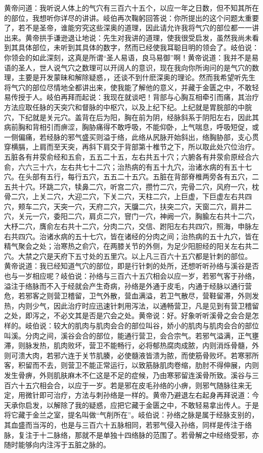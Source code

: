 \documentclass[a4paper,12pt,UTF8,twoside]{ctexbook}
\begin{document}
黄帝问道：我听说人体上的气穴有三百六十五个，以应一年之日数，但不知其所在的部位，我想听你详尽的讲讲。岐伯再次鞠躬回答说：你所提出的这个问题太重要了，若不是圣帝，谁能穷究这些深奥的道理，因此请允许我将气穴的部位都一一讲出来。黄帝拱手谦逊退让地说：先生对我讲的道理，使我很受启发，虽然我尚未看到其具体部位，未听到其具体的数字，然而已经使我耳聪目明的领会了。岐伯说：你领会的如此深刻，这真是所谓“圣人易语，良马易御”啊！黄帝说道：我并不是易语的圣人，世人说气穴之数理可以开阔人的意识，现在我向你所询问的是气穴的数理，主要是开发蒙昧和解除疑惑，，还谈不到什麽深奥的理论。然而我希望听先生将气穴的部位尽情地全都讲出来，使我能了解他的意义，并藏于金匮之中，不敢轻易传授于人。岐伯再拜而起说：我现在就谈吧！背部与心胸互相牵引而痛，其治疗方法应取任脉的天突穴和督脉的中枢穴，以及上纪下纪。上纪就是胃脘部的中脘穴，下纪就是关元穴。盖背在后为阳，胸在前为阴，经脉斜系于阴阳左右，因此其病前胸和背相引而痹涩，胸胁痛得不敢呼吸，不能仰卧，上气喘息，呼吸短促，或一侧偏痛，若经脉的邪气盛买则溢于络，此络从尻脉开始斜出，络胸胁部，支心贯穿横膈，上肩而至天突，再斜下肩交于背部第十椎节之下，所以取此处穴位治疗。
五脏各有井荥俞经和五俞，五五二十五，左右共五十穴；六腑各有井荥俞原经合六俞，六六三十六，左右共七十二穴；治热病的有五十九穴，治诸水病的有五十七穴。在头部有五行，每行五穴，五五二十五穴。五脏在背部脊椎两旁各有五穴，二五共十穴。环跳二穴，犊鼻二穴，听宫二穴，攒竹二穴，完骨二穴，风府一穴，枕骨二穴，上关二穴，大迎二穴，下关二穴，天柱二穴，上巨虚，下巨虚左右共四穴，颊车二穴，天突一穴，天府二穴，天牖二穴，扶突二穴，天窗二穴，肩井二穴，关元一穴，委阳二穴，肩贞二穴，窨门一穴，神阙一穴，胸腧左右共十二穴，大杼二穴，膺俞左右共十二穴，分肉二穴，交信、跗阳左右共四穴，照海，申脉左右共四穴。治诸水病的五十七穴，皆在诸经的分肉之间；治热病的五十九穴，皆在精气聚会之处；治寒热之俞穴，在两膝关节的外侧，为足少阳胆经的阳关左右共二穴。大禁之穴是天府下五寸处的五里穴。以上凡三百六十五穴都是针刺的部位。
黄帝说道：我已经知道气穴的部位，即是行针刺的处所，还想听听孙络与溪谷是否也与一岁相应呢？岐伯说：孙络与三百六十五穴相会以应一岁，若邪气客于孙络，溢注于络脉而不入于经就会产生奇病，孙络是外通于皮毛，内通于经脉以通行营危，若邪客之则营卫稽留，卫气外散，营血满溢，若卫气散尽，营鞋留滞，外则发热，内则少气，因此治疗时应迅速针刺用泻法，以通畅营卫，凡是见到有营卫稽留之处，即泻之，不必文其是否是穴会之处。黄帝说：好。好象听听溪骨之会合是怎样的。岐伯说：较大的肌肉与肌肉会合的部位叫谷，娇小的肌肉与肌肉会合的部位叫溪。分肉之间，溪谷会合的部位，能通行营卫，会合宗气。若邪气溢满，正气壅滞，则脉发热，肌肉败坏，营卫不能畅行，必将郁热腐肉成脓，内则消烁骨髓，外则可溃大肉，若邪六连于关节肌腠，必使髓液皆溃为脓，而使筋骨败坏。若寒邪所客，积留而不去，则营卫不能正常运行，以致筋脉肌肉卷缩，肋肘不得伸展，内则发生骨痹，外则肌肤麻木不仁这是不足的症候，乃由寒邪留连溪骨所致。溪谷与三百六十五穴相会合，以应于一岁。若是邪在皮毛孙络的小痹，则邪气随脉往来无定，用微针即可治疗，方法与刺孙络是一样的。黄帝乃避退左右起身再拜说道：今天承你启发，以解除了我的疑惑，应把它藏于金匮之中，不敢轻易拿出传人。于是将它藏于金兰之室，提名叫做“气削所在”。岐伯说：孙络之脉是属于经脉支别的，其血盛而当泻的，也是与三百六十五脉相同，若邪气侵入孙络，同样是传注于络脉，复注于十二脉络，那就不是单独十四络脉的范围了。若骨解之中经络受邪，亦随时能够向内注泻于五脏之脉的。
\end{document}
